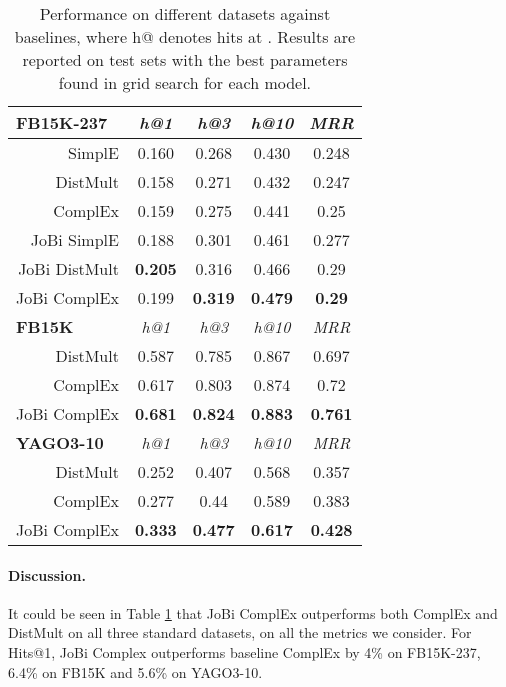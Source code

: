\documentclass[11pt,a4paper, dvipsnames]{article}
\begin{document}
\begin{table}[t!] \centering
    \small
    \begin{tabular}{r | c c c c  }
     \hline \hline
      \multicolumn{1}{l|}{\textbf{FB15K-237}}  & \textit{h@1} & \textit{h@3} & \textit{h@10} & \textit{MRR} \\
         \hline
         SimplE & 0.160 & 0.268 & 0.430 & 0.248 \\
         DistMult & 0.158 & 0.271 & 0.432 & 0.247  \\
         ComplEx & 0.159 & 0.275 & 0.441 &0.25 \\ 
         JoBi SimplE  & 0.188 & 0.301 & 0.461 & 0.277 \\
         JoBi DistMult  & \textbf{0.205} & 0.316 & 0.466 & 0.29 \\
         JoBi ComplEx  & 0.199 & \textbf{0.319} & \textbf{0.479} & \textbf{0.29}  \\
         \hline \hline
       \multicolumn{1}{l|}{\textbf{FB15K}}  & \textit{h@1} & \textit{h@3} & \textit{h@10} & \textit{MRR} \\
         \hline 
         DistMult & 0.587 & 0.785 & 0.867 & 0.697 \\
         ComplEx & 0.617 & 0.803  & 0.874 & 0.72 \\ 
         JoBi ComplEx  & \textbf{0.681} & \textbf{0.824} & \textbf{0.883} & \textbf{0.761}  \\
         \hline \hline
       \multicolumn{1}{l|}{\textbf{YAGO3-10}}  & \textit{h@1} & \textit{h@3} & \textit{h@10} & \textit{MRR} \\
         \hline
         DistMult & 0.252 & 0.407 & 0.568 & 0.357 \\
         ComplEx & 0.277 & 0.44 & 0.589 & 0.383 \\ 
         JoBi ComplEx  & \textbf{0.333} & \textbf{0.477} & \textbf{0.617} & \textbf{0.428}  \\
         
    \end{tabular}
    \caption{Performance on different datasets against baselines, where h@ denotes hits at . Results are reported on test sets with the best parameters found in grid search for each model.}
    \label{tab:smalldatasets}
\end{table}

\paragraph{Discussion.} It could be seen in Table \ref{tab:smalldatasets} that JoBi ComplEx outperforms both ComplEx and DistMult on all three standard datasets, on all the metrics we consider. For Hits@1, JoBi Complex outperforms baseline ComplEx by 4\% on FB15K-237, 6.4\% on FB15K and 5.6\% on YAGO3-10. 
\end{document}
